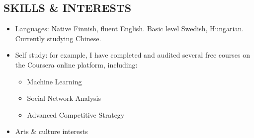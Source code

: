 \documentclass[margin, 10pt]{res} %
\begin{document}
\begin{resume}
\section{SKILLS \& INTERESTS}
\begin{itemize} \itemsep -2pt
\item Languages: Native Finnish, fluent English. Basic level Swedish, Hungarian. Currently studying Chinese.
\item Self study: for example, I have completed and audited several free courses on the Coursera online platform, including:
  \begin{itemize} \itemsep -2pt
  \item Machine Learning
  \item Social Network Analysis
  \item Advanced Competitive Strategy
  \end{itemize}
\item Arts \& culture interests
\end{itemize}


\end{resume}
\end{document}
